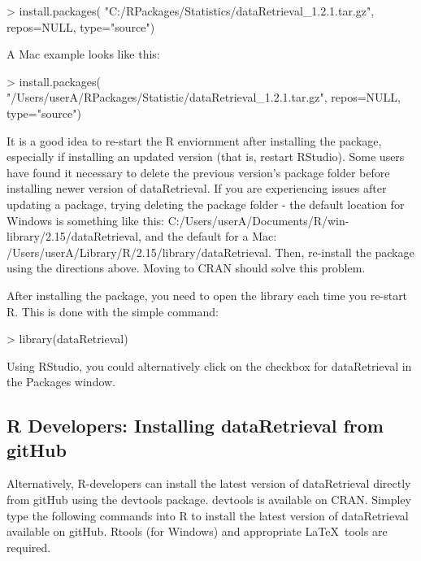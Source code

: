 \documentclass[a4paper,11pt]{article}
\begin{document}
\begin{Schunk}
\begin{Sinput}
> install.packages(
   "C:/RPackages/Statistics/dataRetrieval_1.2.1.tar.gz", 
   repos=NULL, type="source")
\end{Sinput}
\end{Schunk}

A Mac example looks like this:

\begin{Schunk}
\begin{Sinput}
> install.packages(
   "/Users/userA/RPackages/Statistic/dataRetrieval_1.2.1.tar.gz", 
   repos=NULL, type="source")
\end{Sinput}
\end{Schunk}

It is a good idea to re-start the R enviornment after installing the package, especially if installing an updated version (that is, restart RStudio). Some users have found it necessary to delete the previous version's package folder before installing newer version of dataRetrieval. If you are experiencing issues after updating a package, trying deleting the package folder - the default location for Windows is something like this: C:/Users/userA/Documents/R/win-library/2.15/dataRetrieval, and the default for a Mac: /Users/userA/Library/R/2.15/library/dataRetrieval. Then, re-install the package using the directions above. Moving to CRAN should solve this problem.

After installing the package, you need to open the library each time you re-start R.  This is done with the simple command:
\begin{Schunk}
\begin{Sinput}
> library(dataRetrieval)
\end{Sinput}
\end{Schunk}
Using RStudio, you could alternatively click on the checkbox for dataRetrieval in the Packages window.

\subsection{R Developers: Installing dataRetrieval from gitHub}
Alternatively, R-developers can install the latest version of dataRetrieval directly from gitHub using the devtools package.  devtools is available on CRAN.  Simpley type the following commands into R to install the latest version of dataRetrieval available on gitHub.  Rtools (for Windows) and appropriate \LaTeX\ tools are required.
\end{document}
